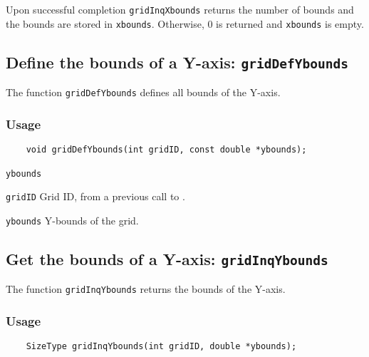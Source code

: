 Upon successful completion {\texttt{gridInqXbounds}} returns the number of bounds and
the bounds are stored in {\texttt{xbounds}}.
Otherwise, 0 is returned and {\texttt{xbounds}} is empty.



\subsection{Define the bounds of a Y-axis: \texttt{gridDefYbounds}}
\label{gridDefYbounds}

The function {\texttt{gridDefYbounds}} defines all bounds of the Y-axis.

\subsubsection*{Usage}

\begin{verbatim}
    void gridDefYbounds(int gridID, const double *ybounds);
\end{verbatim}

\hspace*{4mm}\begin{minipage}[]{15cm}
\begin{deflist}{\texttt{ybounds}\ }
\item[\texttt{gridID}]
Grid ID, from a previous call to {}.
\item[\texttt{ybounds}]
Y-bounds of the grid.

\end{deflist}
\end{minipage}


\subsection{Get the bounds of a Y-axis: \texttt{gridInqYbounds}}
\label{gridInqYbounds}

The function {\texttt{gridInqYbounds}} returns the bounds of the Y-axis.

\subsubsection*{Usage}

\begin{verbatim}
    SizeType gridInqYbounds(int gridID, double *ybounds);
\end{verbatim}

